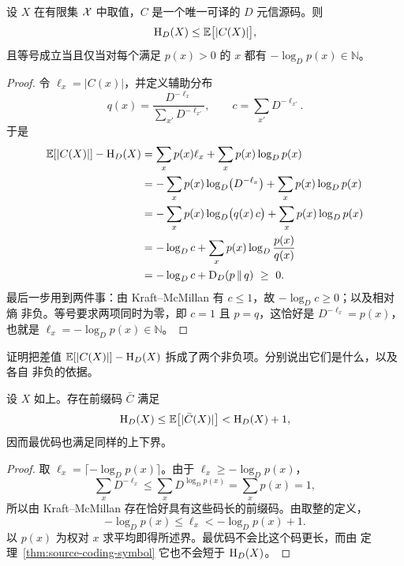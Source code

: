 
\begin{theorem}\label{thm:source-coding-symbol}
设 $X$ 在有限集 $\mathcal{X}$ 中取值，$C$ 是一个唯一可译的 $D$ 元信源码。则
\[
  \mathrm{H}_D(X)\le\mathbb{E}\bigl[|C(X)|\bigr],
\]
且等号成立当且仅当对每个满足 $p(x)>0$ 的 $x$ 都有 $-\log_Dp(x)\in\mathbb{N}$。
\end{theorem}

\begin{proof}
令 $\ell_x=|C(x)|$，并定义辅助分布
\[
  q(x)=\frac{D^{-\ell_x}}{\sum_{x'}D^{-\ell_{x'}}},
  \qquad
  c=\sum_{x'}D^{-\ell_{x'}}.
\]
于是
\[
\begin{aligned}
  \mathbb{E}[|C(X)|]-\mathrm{H}_D(X)
  &=\sum_xp(x)\ell_x+\sum_xp(x)\log_Dp(x)\\
  &=-\sum_xp(x)\log_D\!\left(D^{-\ell_x}\right)+\sum_xp(x)\log_Dp(x)\\
  &=-\sum_xp(x)\log_D\bigl(q(x)\,c\bigr)+\sum_xp(x)\log_Dp(x)\\
  &=-\log_Dc+\sum_xp(x)\log_D\frac{p(x)}{q(x)}\\
  &=-\log_Dc+\mathrm{D}_D(p\,\|\,q)\ \ge\ 0.
\end{aligned}
\]
最后一步用到两件事：由 Kraft--McMillan 有 $c\le1$，故 $-\log_Dc\ge0$；以及相对熵
非负。等号要求两项同时为零，即 $c=1$ 且 $p=q$，这恰好是 $D^{-\ell_x}=p(x)$，
也就是 $\ell_x=-\log_Dp(x)\in\mathbb{N}$。
\end{proof}

\begin{yourturn}
证明把差值 $\mathbb{E}[|C(X)|]-\mathrm{H}_D(X)$ 拆成了两个非负项。分别说出它们是什么，以及各自
非负的依据。
\ifshowanswers\else\workspace[2]\fi
{}
\end{yourturn}


\begin{proposition}[Shannon 码]\label{prop:shannon-code}
设 $X$ 如上。存在前缀码 $\bar C$ 满足
\[
  \mathrm{H}_D(X)\le\mathbb{E}\bigl[|\bar C(X)|\bigr]<\mathrm{H}_D(X)+1,
\]
因而最优码也满足同样的上下界。
\end{proposition}

\begin{proof}
取 $\ell_x=\lceil-\log_Dp(x)\rceil$。由于 $\ell_x\ge-\log_Dp(x)$，
\[
  \sum_xD^{-\ell_x}
  \le\sum_xD^{\log_Dp(x)}
  =\sum_xp(x)=1,
\]
所以由 Kraft--McMillan 存在恰好具有这些码长的前缀码。由取整的定义，
\[
  -\log_Dp(x)\le\ell_x<-\log_Dp(x)+1 .
\]
以 $p(x)$ 为权对 $x$ 求平均即得所述界。最优码不会比这个码更长，而由
定理~\ref{thm:source-coding-symbol} 它也不会短于 $\mathrm{H}_D(X)$。
\end{proof}

